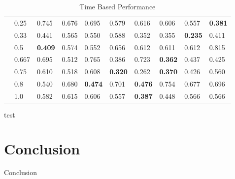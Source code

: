 \documentclass[12pt]{article}
\begin{document}
\begin{table}[h]
\begin{tabular}{|l|l|l|l|l|l|l|l|l|l|}
\multicolumn{1}{|c|}{}                             & 0.25               & 0.745       & 0.676       & 0.695        & 0.579       & 0.616       & 0.606       & 0.557       & {\bf 0.381} \\
\multicolumn{1}{|c|}{}                             & 0.33               & 0.441       & 0.565       & 0.550        & 0.588       & 0.352       & 0.355       & {\bf 0.235} & 0.411       \\
\multicolumn{1}{|c|}{}                             & 0.5                & {\bf 0.409} & 0.574       & 0.552        & 0.656       & 0.612       & 0.611       & 0.612       & 0.815       \\
\multicolumn{1}{|c|}{}                             & 0.667              & 0.695       & 0.512       & 0.765        & 0.386       & 0.723       & {\bf 0.362} & 0.437       & 0.425       \\
\multicolumn{1}{|c|}{}                             & 0.75               & 0.610       & 0.518       & 0.608        & {\bf 0.320} & 0.262       & {\bf 0.370} & 0.426       & 0.560       \\
\multicolumn{1}{|c|}{}                             & 0.8                & 0.540       & 0.680       & {\bf 0.474}  & 0.701       & {\bf 0.476} & 0.754       & 0.677       & 0.696       \\
\multicolumn{1}{|c|}{}                             & 1.0               & 0.582       & 0.615       & 0.606        & 0.557       & {\bf 0.387} & 0.448       & 0.566       & 0.566       \\ \hline
\end{tabular}
\caption{Time Based Performance}
\label{my-label}
\end{table}

\par{test}

\section{Conclusion}

\par{Conclusion}






\end{document}
